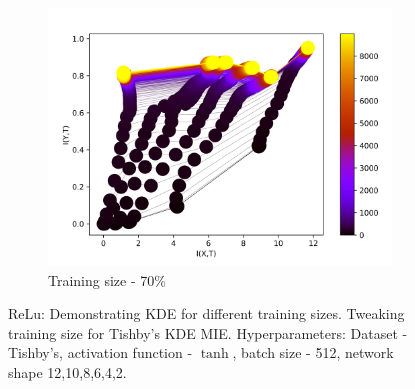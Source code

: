\documentclass[dissertation.tex]{subfiles}
\begin{document}
\begin{figure}[ht]
\begin{subfigure}[t]{0.32\textwidth}
    \includegraphics[width=\textwidth]{figs/eval/trainingSizeRelu/KDE70.png}
    \caption{
      Training size - 70\%
    }
  \end{subfigure}
  \caption{
      ReLu: Demonstrating KDE for different training sizes.  Tweaking training
      size for Tishby's KDE MIE. Hyperparameters: Dataset - Tishby's, activation
      function - $\tanh$, batch size - 512, network shape 12,10,8,6,4,2.
    }
  \label{figKDETSRelu}
\end{figure}
  
\end{document}
